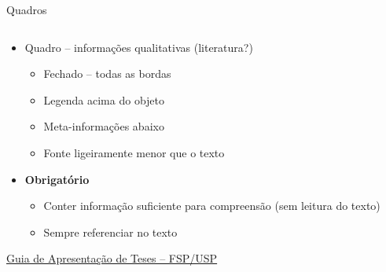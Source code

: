 \documentclass{beamer}
\begin{document}

\begin{frame}{\scriptsize Quadros}
  \begin{columns}%
    \begin{column}{.5\textwidth}
      \begin{itemize}
        \scriptsize
      \item Quadro -- informações qualitativas ({\tiny literatura?})
        \begin{itemize}
          \tiny
        \item Fechado -- todas as bordas
        \item Legenda acima do objeto
        \item Meta-informações abaixo
        \item Fonte ligeiramente menor que o texto
        \end{itemize}
        \bigskip
      \item \alert{\bf Obrigatório}
        \begin{itemize}
          \tiny
        \item Conter informação suficiente para compreensão ({\tiny sem leitura do texto})
        \item Sempre referenciar no texto
        \end{itemize}
      \end{itemize}
      \bigskip
      \bigskip
      \tiny
      \hfill \href{http://www.biblioteca.fsp.usp.br/~biblioteca/guia/i_cap_04.htm}
      {Guia de Apresentação de Teses -- FSP/USP}


\end{column}
\end{columns}
\end{frame}
\end{document}

